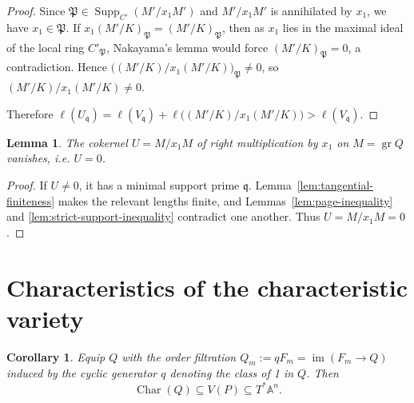 \documentclass[11pt]{amsart}
\numberwithin{equation}{section}
\newtheorem{lemma}[theorem]{Lemma}
\newtheorem{corollary}[theorem]{Corollary}
\theoremstyle{plain}
\theoremstyle{remark}
\newcommand{\Char}{\operatorname{Char}}
\newcommand{\bbA}{\mathbb{A}}
\begin{document}
\begin{proof}
Since $\mathfrak P\in\operatorname{Supp}_{C'}(M'/{x_1}M')$ and $M'/{x_1}M'$ is annihilated by
${x_1}$, we have ${x_1}\in\mathfrak P$. If ${x_1}(M'/K)_{\mathfrak P}=(M'/K)_{\mathfrak P}$, then as
${x_1}$ lies in the maximal ideal of the local ring $C'_{\mathfrak P}$, Nakayama's lemma \cite{nakayama}
would force $(M'/K)_{\mathfrak P}=0$, a contradiction. Hence
$\bigl((M'/K)/{x_1}(M'/K)\bigr)_{\mathfrak P}\ne0$, so $(M'/K)/{x_1}(M'/K)\ne0$.

Therefore $\ell(U_{\mathfrak q})=\ell(V_{\mathfrak q})+\ell\bigl((M'/K)/{x_1}(M'/K)\bigr)
>\ell(V_{\mathfrak q})$.
\end{proof}


\begin{lemma}\label{lem:Uzero}
The cokernel $U=M/x_1M$ of right multiplication by $x_1$ on
$M=\operatorname{gr}Q$ vanishes, i.e. $U=0$.
\end{lemma}
\begin{proof}
If $U\ne0$, it has a minimal support prime $\mathfrak q$.
Lemma~\ref{lem:tangential-finiteness} makes the relevant lengths finite,
and Lemmas~\ref{lem:page-inequality} and
\ref{lem:strict-support-inequality} contradict one another.
Thus $U = M/{x_1}M=0$.
\end{proof}


\section{Characteristics of the characteristic variety}\label{sec:char}
\begin{corollary}\label{cor:charP}
Equip $Q$ with the order filtration $Q_m:=qF_m=\operatorname{im}(F_m\to Q)$
induced by the cyclic generator $q$ denoting the class of 1 in $Q$. Then
\begin{equation}\label{eq:char-contained}
  \Char(Q)\subseteq V(P)\subseteq T^*\bbA^n .
\end{equation}
\end{corollary}
\end{document}
